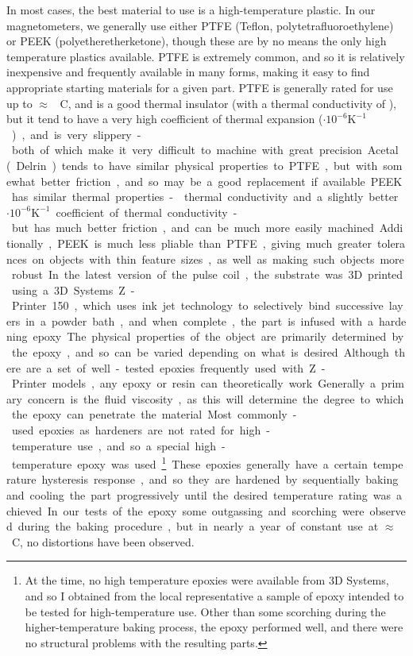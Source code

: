 \documentclass[PaulGanssle-Thesis.tex]{subfiles}
\begin{document}
In most cases, the best material to use is a high-temperature plastic. In our magnetometers, we generally use either PTFE (Teflon, polytetrafluoroethylene) or PEEK (polyetheretherketone), though these are by no means the only high temperature plastics available. PTFE is extremely common, and so it is relatively inexpensive and frequently available in many forms, making it easy to find appropriate starting materials for a given part. PTFE is generally rated for use up to $\approx$ \unit[300]{\degsym C}, and is a good thermal insulator (with a thermal conductivity of ), but it tend to have a very high coefficient of thermal expansion (\unit[135]{$\cdot\mathrm{10}^{-6}\mathrm{K}^{-1}$}), and is very slippery - both of which make it very difficult to machine with great precision. Acetal (Delrin) tends to have similar physical properties to PTFE, but with somewhat better friction, and so may be a good replacement if available. PEEK has similar thermal properties -  thermal conductivity and a slightly better \unit[60]{$\cdot\mathrm{10}^{-6}\mathrm{K}^{-1}$} coefficient of thermal conductivity - but has much better friction, and can be much more easily machined. Additionally, PEEK is much less pliable than PTFE, giving much greater tolerances on objects with thin feature sizes, as well as making such objects more robust.

In the latest version of the pulse coil, the substrate was 3D printed using a 3D Systems Z-Printer 150, which uses ink jet technology to selectively bind successive layers in a powder bath, and when complete, the part is infused with a hardening epoxy. The physical properties of the object are primarily determined by the epoxy, and so can be varied depending on what is desired. Although there are a set of well-tested epoxies frequently used with Z-Printer models, any epoxy or resin can theoretically work. Generally a primary concern is the fluid viscosity, as this will determine the degree to which the epoxy can penetrate the material. Most commonly-used epoxies as hardeners are not rated for high-temperature use, and so a special high-temperature epoxy was used.\footnote{At the time, no high temperature epoxies were available from 3D Systems, and so I obtained from the local representative a sample of epoxy intended to be tested for high-temperature use. Other than some scorching during the higher-temperature baking process, the epoxy performed well, and there were no structural problems with the resulting parts.} These epoxies generally have a certain temperature hysteresis response, and so they are hardened by sequentially baking and cooling the part progressively until the desired temperature rating was achieved. In our tests of the epoxy some outgassing and scorching were observed during the baking procedure, but in nearly a year of constant use at $\approx$ \unit[90-150]{\degsym C}, no distortions have been observed.
\end{document}
